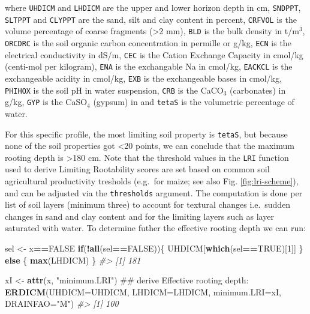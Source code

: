 \documentclass[graybox,natbib,nospthms,UStrade]{svmono}
\newenvironment{Shaded}{\begin{snugshade}}{\end{snugshade}}
\newcommand{\CommentTok}[1]{\textcolor[rgb]{0.37,0.37,0.37}{\textit{#1}}}
\newcommand{\ControlFlowTok}[1]{\textcolor[rgb]{0.27,0.27,0.27}{\textbf{#1}}}
\newcommand{\DataTypeTok}[1]{\textcolor[rgb]{0.27,0.27,0.27}{#1}}
\newcommand{\DecValTok}[1]{\textcolor[rgb]{0.06,0.06,0.06}{#1}}
\newcommand{\KeywordTok}[1]{\textcolor[rgb]{0.27,0.27,0.27}{\textbf{#1}}}
\newcommand{\NormalTok}[1]{#1}
\newcommand{\OperatorTok}[1]{\textcolor[rgb]{0.43,0.43,0.43}{\textbf{#1}}}
\newcommand{\OtherTok}[1]{\textcolor[rgb]{0.37,0.37,0.37}{#1}}
\newcommand{\StringTok}[1]{\textcolor[rgb]{0.5,0.5,0.5}{#1}}
\begin{document}
where \texttt{UHDICM} and \texttt{LHDICM} are the upper and lower horizon depth in cm,
\texttt{SNDPPT}, \texttt{SLTPPT} and \texttt{CLYPPT} are the sand, silt and clay content in
percent, \texttt{CRFVOL} is the volume percentage of coarse fragments (\textgreater{}2 mm),
\texttt{BLD} is the bulk density in t/m\(^3\), \texttt{ORCDRC} is the soil organic carbon
concentration in permille or g/kg, \texttt{ECN} is the electrical conductivity in dS/m,
\texttt{CEC} is the Cation Exchange Capacity in cmol/kg (centi-mol per kilogram), \texttt{ENA} is the exchangable Na
in cmol/kg, \texttt{EACKCL} is the exchangeable acidity in cmol/kg, \texttt{EXB} is the exchangeable
bases in cmol/kg, \texttt{PHIHOX} is the soil pH in water suspension, \texttt{CRB} is the
CaCO\(_3\) (carbonates) in g/kg, \texttt{GYP} is the CaSO\(_4\) (gypsum) in and \texttt{tetaS}
is the volumetric percentage of water.

For this specific profile, the most limiting soil property is \texttt{tetaS}, but
because none of the soil properties got \textless{}20 points, we can conclude
that the maximum rooting depth is \textgreater{}180 cm. Note that the threshold values in
the \texttt{LRI} function used to derive Limiting Rootability scores are set
based on common soil agricultural productivity tresholds (e.g.~for
maize; see also Fig. \ref{fig:lri-scheme}), and can be adjusted via the
\texttt{thresholds} argument. The computation is done per list of soil layers
(minimum three) to account for textural changes i.e.~sudden changes in
sand and clay content and for the limiting layers such as layer
saturated with water. To determine futher the effective rooting depth we can run:

\begin{Shaded}
\begin{Highlighting}[]
\NormalTok{sel <-}\StringTok{ }\NormalTok{x}\OperatorTok{==}\OtherTok{FALSE}
\ControlFlowTok{if}\NormalTok{(}\OperatorTok{!}\KeywordTok{all}\NormalTok{(sel}\OperatorTok{==}\OtherTok{FALSE}\NormalTok{))\{ }
\NormalTok{  UHDICM[}\KeywordTok{which}\NormalTok{(sel}\OperatorTok{==}\OtherTok{TRUE}\NormalTok{)[}\DecValTok{1}\NormalTok{]] }
\NormalTok{\} }\ControlFlowTok{else}\NormalTok{ \{}
  \KeywordTok{max}\NormalTok{(LHDICM)}
\NormalTok{\}}
\CommentTok{#> [1] 181}

\NormalTok{xI <-}\StringTok{ }\KeywordTok{attr}\NormalTok{(x, }\StringTok{"minimum.LRI"}\NormalTok{)}
\NormalTok{## derive Effective rooting depth:}
\KeywordTok{ERDICM}\NormalTok{(}\DataTypeTok{UHDICM=}\NormalTok{UHDICM, }\DataTypeTok{LHDICM=}\NormalTok{LHDICM, }\DataTypeTok{minimum.LRI=}\NormalTok{xI, }\DataTypeTok{DRAINFAO=}\StringTok{"M"}\NormalTok{)}
\CommentTok{#> [1] 100}
\end{Highlighting}
\end{Shaded}
\end{document}
